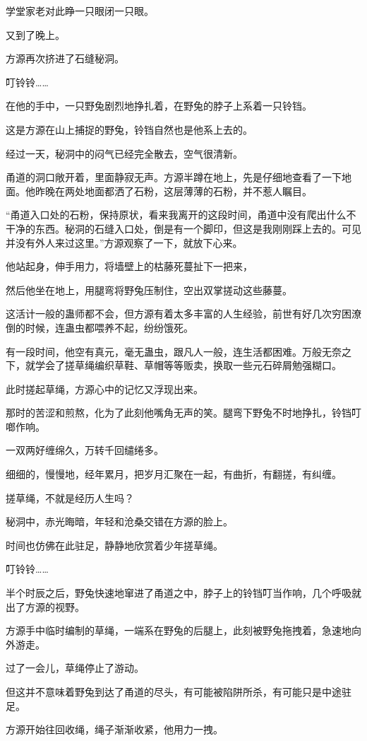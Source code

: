 \begin{this_body}
学堂家老对此睁一只眼闭一只眼。

又到了晚上。

方源再次挤进了石缝秘洞。

叮铃铃……

在他的手中，一只野兔剧烈地挣扎着，在野兔的脖子上系着一只铃铛。

这是方源在山上捕捉的野兔，铃铛自然也是他系上去的。

经过一天，秘洞中的闷气已经完全散去，空气很清新。

甬道的洞口敞开着，里面静寂无声。方源半蹲在地上，先是仔细地查看了一下地面。他昨晚在两处地面都洒了石粉，这层薄薄的石粉，并不惹人瞩目。

“甬道入口处的石粉，保持原状，看来我离开的这段时间，甬道中没有爬出什么不干净的东西。秘洞的石缝入口处，倒是有一个脚印，但这是我刚刚踩上去的。可见并没有外人来过这里。”方源观察了一下，就放下心来。

他站起身，伸手用力，将墙壁上的枯藤死蔓扯下一把来，

然后他坐在地上，用腿弯将野兔压制住，空出双掌搓动这些藤蔓。

这活计一般的蛊师都不会，但方源有着太多丰富的人生经验，前世有好几次穷困潦倒的时候，连蛊虫都喂养不起，纷纷饿死。

有一段时间，他空有真元，毫无蛊虫，跟凡人一般，连生活都困难。万般无奈之下，就学会了搓草绳编织草鞋、草帽等等贩卖，换取一些元石碎屑勉强糊口。

此时搓起草绳，方源心中的记忆又浮现出来。

那时的苦涩和煎熬，化为了此刻他嘴角无声的笑。腿弯下野兔不时地挣扎，铃铛叮啷作响。

一双两好缠绵久，万转千回缱绻多。

细细的，慢慢地，经年累月，把岁月汇聚在一起，有曲折，有翻搓，有纠缠。

搓草绳，不就是经历人生吗？

秘洞中，赤光晦暗，年轻和沧桑交错在方源的脸上。

时间也仿佛在此驻足，静静地欣赏着少年搓草绳。

叮铃铃……

半个时辰之后，野兔快速地窜进了甬道之中，脖子上的铃铛叮当作响，几个呼吸就出了方源的视野。

方源手中临时编制的草绳，一端系在野兔的后腿上，此刻被野兔拖拽着，急速地向外游走。

过了一会儿，草绳停止了游动。

但这并不意味着野兔到达了甬道的尽头，有可能被陷阱所杀，有可能只是中途驻足。

方源开始往回收绳，绳子渐渐收紧，他用力一拽。


\end{this_body}
